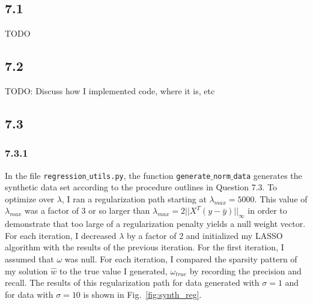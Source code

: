 \documentclass[12pt]{amsart}
\begin{document}
\subsection*{7.1}
TODO

\subsection*{7.2}
TODO: Discuss how I implemented code, where it is, etc

\subsection*{7.3}

\subsubsection*{7.3.1}

In the file {\tt regression$\_$utils.py}, the function {\tt generate$\_$norm$\_$data} generates the synthetic data set according to the procedure outlines in Question 7.3.  To optimize over $\lambda$, I ran a regularization path starting at $\lambda_{max} = 5000$.  This value of  $\lambda_{max}$ was a factor of 3 or so larger than $\lambda_{max} = 2 ||X^{T}(y - \bar{y}) ||_{\infty}$ in order to demonstrate that too large of a regularization penalty yields a null weight vector.  For each iteration, I decreased $\lambda$ by a factor of 2 and initialized my LASSO algorithm with the results of the previous iteration.  For the first iteration, I assumed that $\omega$ was null.  For each iteration, I compared the sparsity pattern of my solution $\hat{w}$ to the true value I generated, $\omega_{true}$ by recording the precision and recall. The results of this regularization path for data generated with $\sigma = 1$ and for data with $\sigma = 10$ is shown in Fig.~\ref{fig:synth_reg}.
\end{document}
